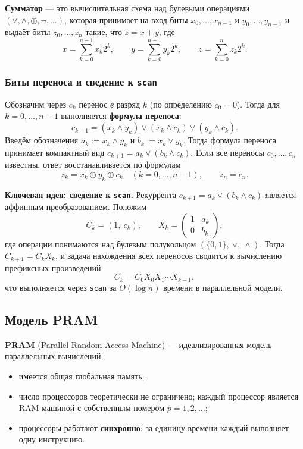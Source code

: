 \begin{Definition}{}{}
	\textbf{Сумматор} — это вычислительная схема над булевыми операциями $(\vee, \wedge, \oplus, \neg, \dots)$, которая принимает на вход биты $x_0, \dots, x_{n-1}$ и $y_0, \dots, y_{n-1}$ и выдаёт биты $z_0, \dots, z_n$ такие, что $z = x + y$, где
	\[
	x = \sum_{k=0}^{n-1} x_k 2^k, \qquad
	y = \sum_{k=0}^{n-1} y_k 2^k, \qquad
	z = \sum_{k=0}^{n} z_k 2^k.
	\]
\end{Definition}

\subsubsection*{Биты переноса и сведение к \texttt{scan}}

Обозначим через $c_k$ перенос \emph{в} разряд $k$ (по определению $c_0 = 0$). Тогда для $k = 0, \dots, n-1$ выполняется \textbf{формула переноса}:
\[
c_{k+1} = (x_k \wedge y_k) \vee (x_k \wedge c_k) \vee (y_k \wedge c_k).
\]
Введём обозначения $a_k := x_k \wedge y_k$ и $b_k := x_k \vee y_k$. Тогда формула переноса принимает компактный вид $c_{k+1} = a_k \vee (b_k \wedge c_k)$. Если все переносы $c_0, \dots, c_n$ известны, ответ восстанавливается по формулам
\[
z_k = x_k \oplus y_k \oplus c_k \quad (k = 0, \dots, n-1), \qquad z_n = c_n.
\]

\textbf{Ключевая идея: сведение к \texttt{scan}.}
Рекуррента $c_{k+1} = a_k \vee (b_k \wedge c_k)$ является аффинным преобразованием. Положим
\[
C_k = (1,\ c_k), \qquad
X_k = \begin{pmatrix} 1 & a_k \\ 0 & b_k \end{pmatrix},
\]
где операции понимаются над булевым полукольцом $(\{0,1\},\ \vee,\ \wedge)$. Тогда $C_{k+1} = C_k X_k$, и задача нахождения всех переносов сводится к вычислению префиксных произведений
\[
C_k = C_0 X_0 X_1 \cdots X_{k-1},
\]
что выполняется через \texttt{scan} за $O(\log n)$ времени в параллельной модели.

\subsection{Модель PRAM}

\begin{Definition}{}{}
	\textbf{PRAM} (Parallel Random Access Machine) — идеализированная модель параллельных вычислений:
	\begin{itemize}
		\item имеется общая глобальная память;
		\item число процессоров теоретически не ограничено; каждый процессор является RAM-машиной с собственным номером $p = 1, 2, \dots$;
		\item процессоры работают \textbf{синхронно}: за единицу времени каждый выполняет одну инструкцию.
	\end{itemize}
\end{Definition}

